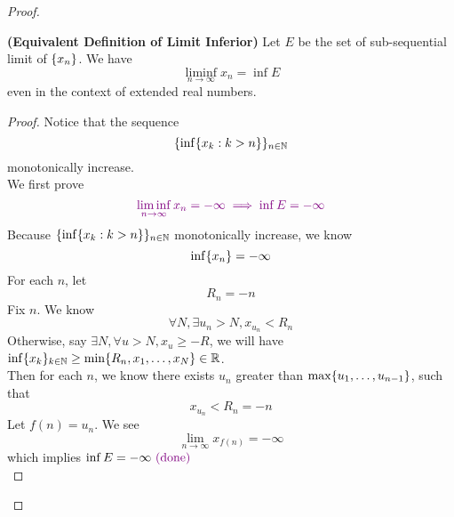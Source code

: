 \documentclass{report}
\begin{document}
\begin{proof}
{\begin{minipage}{39em}
\end{minipage}}

\begin{theorem}
\label{2.3.8}
\textbf{(Equivalent Definition of Limit Inferior)} Let $E$ be the set of sub-sequential limit of $\{ x_n \}$. We have
\begin{equation}
\liminf_{n\to\infty} x_n=\inf E
\end{equation}
even in the context of extended real numbers. 
\end{theorem}
\begin{proof}
Notice that the sequence 
\begin{equation}
\{ \inf \{ x_k:k>n \} \}_{n\in\mathbb{N}}
\end{equation}
monotonically increase.\\

We first prove
\begin{equation}
\textcolor{violet}{\liminf_{n\to\infty} x_n=-\infty\implies \inf E=-\infty}
\end{equation}
Because $\{ \inf \{ x_k:k>n \} \}_{n\in\mathbb{N}}$ monotonically increase, we know
\begin{equation}
\inf \{ x_n \}=-\infty
\end{equation}
For each $n$,  let 
\begin{equation}
R_n=-n
\end{equation}
Fix $n$. We know 
\begin{equation}
\forall N, \exists u_n>N,x_{u_n}<R_n
\end{equation}
Otherwise, say $\exists N,\forall u>N, x_u\geq -R$, we will have $\inf \{ x_k \}_{k\in\mathbb{N}}\geq \min \{ R_n,x_1,\dots ,x_N \}\in\mathbb{R}$.\\

Then for each $n$, we know there exists $u_n$ greater than  $\max \{ u_1,\dots , u_{n-1} \}$, such that 
\begin{equation}
x_{u_n}<R_n=-n
\end{equation}
Let $f(n)=u_n$. We see
\begin{equation}
\lim_{n\to\infty}x_{f(n)}=-\infty 
\end{equation}
which implies $\inf E=-\infty\textcolor{violet}{\text{ (done) }}$\\


\end{proof}
\end{proof}
\end{document}

